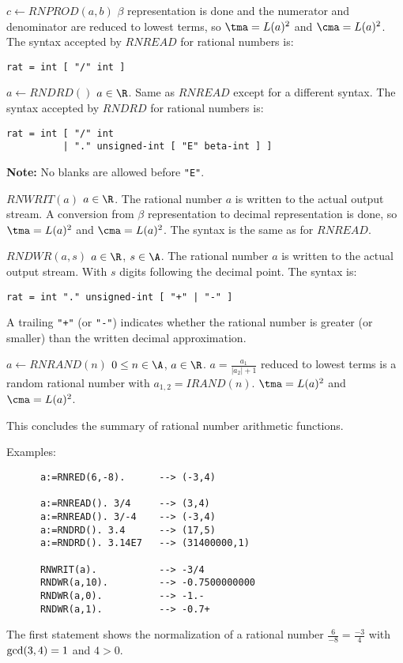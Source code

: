 \begin{deflist}{$c \gets RNPROD(a,b)$}
     $\beta$ representation is done 
     and the numerator and denominator are reduced to lowest terms, 
     so
     $\tma = L(a)^2$ and $\cma = L(a)^2$. \\
     The syntax accepted by $RNREAD$ for rational numbers is:
\begin{verbatim}
rat = int [ "/" int ] 
\end{verbatim}
\item[$a \gets RNDRD()$] $a \in \R$.
     Same as $RNREAD$ except for a different syntax.
     The syntax accepted by $RNDRD$ for rational numbers is:
\begin{verbatim}
rat = int [ "/" int 
          | "." unsigned-int [ "E" beta-int ] ] 
\end{verbatim}
     {\bf Note:} No blanks are allowed before \verb/"E"/.
\item[$RNWRIT(a)$] $a \in \R$.
     The rational number $a$ is written to the actual output stream.
     A conversion from $\beta$ representation to 
     decimal representation is done, so
     $\tma = L(a)^2$ and $\cma = L(a)^2$.
     The syntax is the same as for $RNREAD$.
\item[$RNDWR(a,s)$] $a \in \R$, $s \in \A$.
     The rational number $a$ is written to the actual output stream.
     With $s$ digits following the decimal point.
     The syntax is:
\begin{verbatim}
rat = int "." unsigned-int [ "+" | "-" ] 
\end{verbatim}
     A trailing \verb/"+"/ (or \verb/"-"/) indicates 
     whether the 
     rational number is greater (or smaller) than
     the written decimal approximation.
\item[$a \gets RNRAND(n)$] $0 \leq n \in \A$, $a \in \R$.
     $a = \frac{a_1}{\vert a_2 \vert + 1}$ reduced to lowest terms 
     is a random rational number with $a_{1,2} = IRAND(n)$.
     $\tma = L(a)^2$ and $\cma = L(a)^2$.
\end{deflist}

This concludes the summary of 
rational number arithmetic functions.

Examples:
\begin{verbatim}
      a:=RNRED(6,-8).      --> (-3,4)

      a:=RNREAD(). 3/4     --> (3,4)
      a:=RNREAD(). 3/-4    --> (-3,4)
      a:=RNDRD(). 3.4      --> (17,5)
      a:=RNDRD(). 3.14E7   --> (31400000,1)

      RNWRIT(a).           --> -3/4
      RNDWR(a,10).         --> -0.7500000000
      RNDWR(a,0).          --> -1.-
      RNDWR(a,1).          --> -0.7+
\end{verbatim}
The first statement shows the normalization of 
a rational number $\frac{6}{-8} = \frac{-3}{4}$ 
with ${\rm gcd}(3,4) = 1$ and $4 > 0$. 

